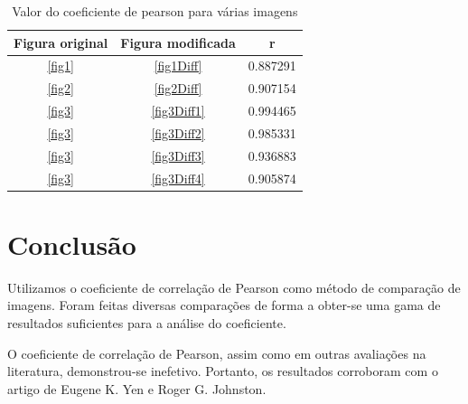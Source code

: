 \documentclass[10pt,a4paper]{article}
\begin{document}
\begin{table}
  \begin{center}
    \caption{Valor do coeficiente de pearson para várias imagens}
    \begin{tabular}{|c|c|c|}
      \hline
      
      Figura original & Figura modificada & r\\
      \hline
      \ref{fig1} &  \ref{fig1Diff} &  0.887291 \\
      \ref{fig2} &  \ref{fig2Diff} &  0.907154\\
      \ref{fig3} &  \ref{fig3Diff1} & 0.994465\\
      \ref{fig3} & \ref{fig3Diff2} &  0.985331\\
      \ref{fig3} &  \ref{fig3Diff3} &  0.936883\\
      \ref{fig3} &  \ref{fig3Diff4} &  0.905874\\
      \hline
    \end{tabular}
  \end{center}
\end{table}
\section{Conclusão}
Utilizamos o coeficiente de correlação de Pearson  
 como método de comparação de imagens. Foram feitas diversas
 comparações de forma a obter-se uma gama de resultados suficientes
 para a análise do coeficiente.

O coeficiente de correlação de Pearson, assim como em outras
avaliações na literatura, demonstrou-se inefetivo. Portanto, os
resultados corroboram com o artigo de Eugene K. Yen e
Roger G. Johnston.



\begin{small}
  
\end{small}
\end{document}
